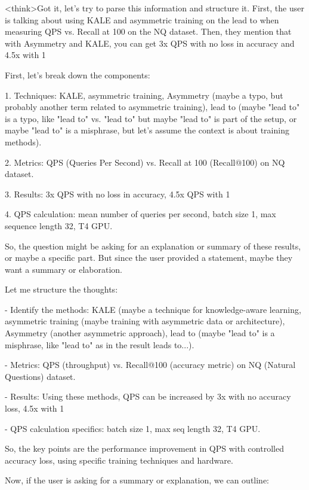 <think>Got it, let's try to parse this information and structure it. First, the user is talking about using KALE and asymmetric training on the lead to when measuring QPS vs. Recall at 100 on the NQ dataset. Then, they mention that with Asymmetry and KALE, you can get 3x QPS with no loss in accuracy and 4.5x with 1%

First, let's break down the components:

1. Techniques: KALE, asymmetric training, Asymmetry (maybe a typo, but probably another term related to asymmetric training), lead to (maybe "lead to" is a typo, like "lead to" vs. "lead to" but maybe "lead to" is part of the setup, or maybe "lead to" is a misphrase, but let's assume the context is about training methods).

2. Metrics: QPS (Queries Per Second) vs. Recall at 100 (Recall@100) on NQ dataset.

3. Results: 3x QPS with no loss in accuracy, 4.5x QPS with 1%

4. QPS calculation: mean number of queries per second, batch size 1, max sequence length 32, T4 GPU.

So, the question might be asking for an explanation or summary of these results, or maybe a specific part. But since the user provided a statement, maybe they want a summary or elaboration.

Let me structure the thoughts:

- Identify the methods: KALE (maybe a technique for knowledge-aware learning, asymmetric training (maybe training with asymmetric data or architecture), Asymmetry (another asymmetric approach), lead to (maybe "lead to" is a misphrase, like "lead to" as in the result leads to...).

- Metrics: QPS (throughput) vs. Recall@100 (accuracy metric) on NQ (Natural Questions) dataset.

- Results: Using these methods, QPS can be increased by 3x with no accuracy loss, 4.5x with 1%

- QPS calculation specifics: batch size 1, max seq length 32, T4 GPU.

So, the key points are the performance improvement in QPS with controlled accuracy loss, using specific training techniques and hardware.

Now, if the user is asking for a summary or explanation, we can outline:

